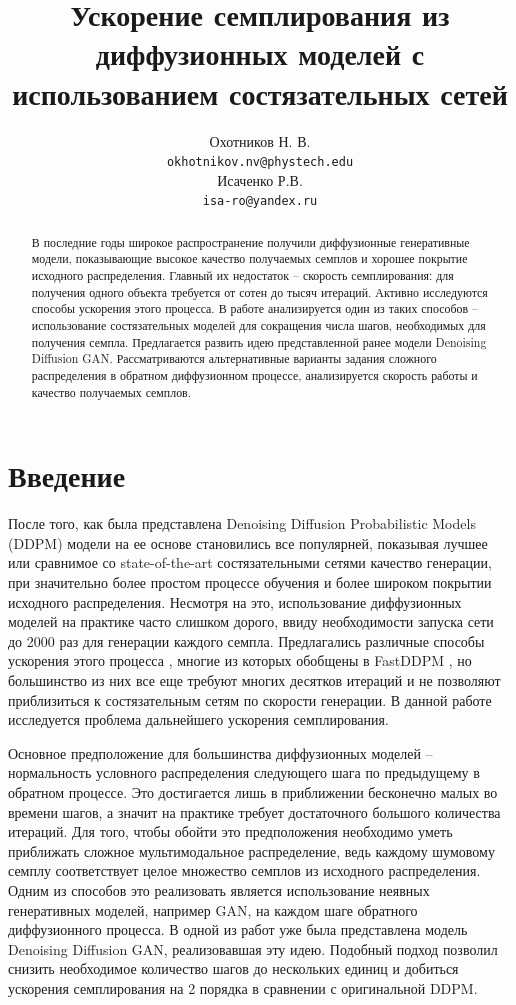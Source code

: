 \documentclass{article}
\title{Ускорение семплирования из диффузионных моделей с использованием состязательных сетей}
\author{Охотников Н. В.\\
	\texttt{okhotnikov.nv@phystech.edu} \\
	\And
    Исаченко Р.В. \\
	\texttt{isa-ro@yandex.ru} \\
}
\date{}
\begin{document}
\maketitle
\begin{abstract}
	В последние годы широкое распространение получили диффузионные генеративные модели, показывающие высокое качество получаемых семплов и хорошее покрытие исходного распределения. Главный их недостаток -- скорость семплирования: для получения одного объекта требуется от сотен до тысяч итераций. Активно исследуются способы ускорения этого процесса. В работе анализируется один из таких способов -- использование состязательных моделей для сокращения числа шагов, необходимых для получения семпла. Предлагается развить идею представленной ранее модели Denoising Diffusion GAN. Рассматриваются альтернативные варианты задания сложного распределения в обратном диффузионном процессе, анализируется скорость работы и качество получаемых семплов.
\end{abstract}

\section{Введение}
 После того, как была представлена Denoising Diffusion Probabilistic Models (DDPM) \cite{https://doi.org/10.48550/arxiv.2006.11239} модели на ее основе становились все популярней, показывая лучшее или сравнимое со state-of-the-art состязательными сетями \cite{https://doi.org/10.48550/arxiv.1812.04948} качество генерации\cite{https://doi.org/10.48550/arxiv.2105.05233}, при значительно более простом процессе обучения и более широком покрытии исходного распределения. Несмотря на это, использование диффузионных моделей на практике часто слишком дорого, ввиду необходимости запуска сети до 2000 раз для генерации каждого семпла. Предлагались различные способы ускорения этого процесса \cite{https://doi.org/10.48550/arxiv.2102.09672}, многие из которых обобщены в FastDDPM \cite{https://doi.org/10.48550/arxiv.2106.00132}, но большинство из них все еще требуют многих десятков итераций и не позволяют приблизиться к состязательным сетям по скорости генерации. В данной работе исследуется проблема дальнейшего ускорения семплирования.
 
 Основное предположение для большинства диффузионных моделей -- нормальность условного распределения следующего шага по предыдущему в обратном процессе. Это достигается лишь в приближении бесконечно малых во времени шагов, а значит на практике требует достаточного большого количества итераций. Для того, чтобы обойти это предположения необходимо уметь приближать сложное мультимодальное распределение, ведь каждому шумовому семплу соответствует целое множество семплов из исходного распределения. Одним из способов это реализовать является использование неявных генеративных моделей, например GAN, на каждом шаге обратного диффузионного процесса. В одной из работ \cite{https://doi.org/10.48550/arxiv.2112.07804} уже была представлена модель Denoising Diffusion GAN, реализовавшая эту идею. Подобный подход позволил снизить необходимое количество шагов до нескольких единиц и добиться ускорения семплирования на 2 порядка в сравнении с оригинальной DDPM. 
 
\end{document}
